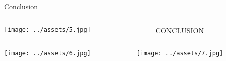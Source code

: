 \documentclass[8pt]{beamer}
\begin{document}
\begin{frame}{Conclusion}
\begin{columns}
    \begin{column}{.6\linewidth}
        \texttt{[image: ../assets/5.jpg]}
    \end{column}
    \begin{column}{.4\linewidth}
        \begin{itemize}
            CONCLUSION
        \end{itemize}
    \end{column}
\end{columns}
\end{frame}

\begin{frame}{}
\begin{columns}
    \begin{column}{.5\linewidth}
        \texttt{[image: ../assets/6.jpg]}
    \end{column}
    \begin{column}{.5\linewidth}
        \texttt{[image: ../assets/7.jpg]}
    \end{column}
\end{columns}
\end{frame}
\end{document}
